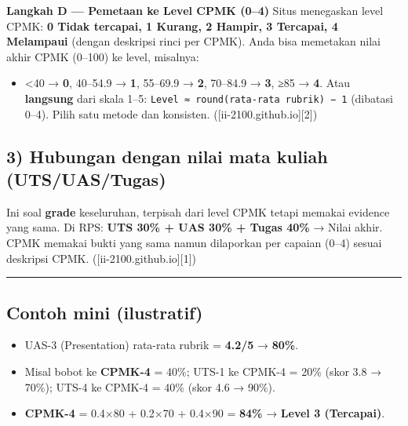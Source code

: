 \documentclass[
  letterpaper,
  DIV=11,
  numbers=noendperiod]{scrreprt}
\providecommand{\tightlist}{%
  \setlength{\itemsep}{0pt}\setlength{\parskip}{0pt}}
\begin{document}
\textbf{Langkah D --- Pemetaan ke Level CPMK (0--4)} Situs menegaskan
level CPMK: \textbf{0 Tidak tercapai, 1 Kurang, 2 Hampir, 3 Tercapai, 4
Melampaui} (dengan deskripsi rinci per CPMK). Anda bisa memetakan nilai
akhir CPMK (0--100) ke level, misalnya:

\begin{itemize}
\tightlist
\item
  \textless40 → \textbf{0}, 40--54.9 → \textbf{1}, 55--69.9 →
  \textbf{2}, 70--84.9 → \textbf{3}, ≥85 → \textbf{4}. Atau
  \textbf{langsung} dari skala 1--5:
  \texttt{Level\ ≈\ round(rata-rata\ rubrik)\ −\ 1} (dibatasi 0--4).
  Pilih satu metode dan konsisten. ({[}ii-2100.github.io{]}{[}2{]})
\end{itemize}

\subsection*{\texorpdfstring{3) Hubungan dengan \textbf{nilai mata
kuliah}
(UTS/UAS/Tugas)}{3) Hubungan dengan nilai mata kuliah (UTS/UAS/Tugas)}}\label{hubungan-dengan-nilai-mata-kuliah-utsuastugas}

Ini soal \textbf{grade} keseluruhan, terpisah dari level CPMK tetapi
memakai evidence yang sama. Di RPS: \textbf{UTS 30\% + UAS 30\% + Tugas
40\%} → Nilai akhir. CPMK memakai bukti yang sama namun dilaporkan per
capaian (0--4) sesuai deskripsi CPMK. ({[}ii-2100.github.io{]}{[}1{]})

\begin{center}\rule{0.5\linewidth}{0.5pt}\end{center}

\subsection*{Contoh mini (ilustratif)}\label{contoh-mini-ilustratif}

\begin{itemize}
\tightlist
\item
  UAS-3 (Presentation) rata-rata rubrik = \textbf{4.2/5} →
  \textbf{80\%}.
\item
  Misal bobot ke \textbf{CPMK-4} = 40\%; UTS-1 ke CPMK-4 = 20\% (skor
  3.8 → 70\%); UTS-4 ke CPMK-4 = 40\% (skor 4.6 → 90\%).
\item
  \textbf{CPMK-4} = 0.4×80 + 0.2×70 + 0.4×90 = \textbf{84\%} →
  \textbf{Level 3 (Tercapai)}.
\end{itemize}
\end{document}
